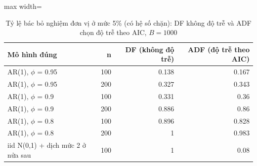 \begin{table}[H]
\centering\footnotesize
\caption{Tỷ lệ bác bỏ nghiệm đơn vị ở mức 5\% (có hệ số chặn): DF không độ trễ và ADF chọn độ trễ theo AIC, $B=1000$}\label{tab:tab_b12_04_adf_power}
\begin{adjustbox}{max width=\linewidth}
\begin{tabular}{|>{\raggedright\arraybackslash}p{}|r|r|r|}
\toprule
Mô hình đúng & n & DF (không độ trễ) & ADF (độ trễ theo AIC) \\
\midrule
AR(1), $\phi$ = 0.95 & 100 & 0.138 & 0.167 \\[3pt]
AR(1), $\phi$ = 0.95 & 200 & 0.327 & 0.343 \\[3pt]
AR(1), $\phi$ = 0.9 & 100 & 0.331 & 0.36 \\[3pt]
AR(1), $\phi$ = 0.9 & 200 & 0.886 & 0.86 \\[3pt]
AR(1), $\phi$ = 0.8 & 100 & 0.896 & 0.828 \\[3pt]
AR(1), $\phi$ = 0.8 & 200 & 1 & 0.983 \\[3pt]
iid N(0,1) + dịch mức 2 ở nửa sau & 100 & 1 & 0.08 \\[3pt]
\bottomrule
\end{tabular}
\end{adjustbox}\par{}
\end{table}
